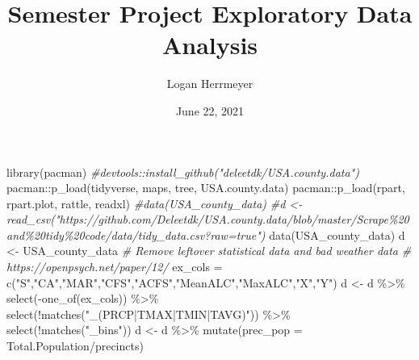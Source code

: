 \documentclass[
]{article}
\title{Semester Project Exploratory Data Analysis}
\author{Logan Herrmeyer}
\date{June 22, 2021}
\newenvironment{Shaded}{\begin{snugshade}}{\end{snugshade}}
\newcommand{\AttributeTok}[1]{\textcolor[rgb]{0.77,0.63,0.00}{#1}}
\newcommand{\CommentTok}[1]{\textcolor[rgb]{0.56,0.35,0.01}{\textit{#1}}}
\newcommand{\FunctionTok}[1]{\textcolor[rgb]{0.00,0.00,0.00}{#1}}
\newcommand{\NormalTok}[1]{#1}
\newcommand{\OtherTok}[1]{\textcolor[rgb]{0.56,0.35,0.01}{#1}}
\newcommand{\SpecialCharTok}[1]{\textcolor[rgb]{0.00,0.00,0.00}{#1}}
\newcommand{\StringTok}[1]{\textcolor[rgb]{0.31,0.60,0.02}{#1}}
\begin{document}
\maketitle

{
\setcounter{tocdepth}{2}
\tableofcontents
}
\begin{Shaded}
\begin{Highlighting}[]
\FunctionTok{library}\NormalTok{(pacman)}
\CommentTok{\#devtools::install\_github("deleetdk/USA.county.data")}
\NormalTok{pacman}\SpecialCharTok{::}\FunctionTok{p\_load}\NormalTok{(tidyverse, maps, tree, USA.county.data)}
\NormalTok{pacman}\SpecialCharTok{::}\FunctionTok{p\_load}\NormalTok{(rpart, rpart.plot, rattle, readxl)}
\CommentTok{\#data(USA\_county\_data)}
\CommentTok{\#d \textless{}{-} read\_csv("https://github.com/Deleetdk/USA.county.data/blob/master/Scrape\%20and\%20tidy\%20code/data/tidy\_data.csv?raw=true")}
\FunctionTok{data}\NormalTok{(USA\_county\_data)}
\NormalTok{d }\OtherTok{\textless{}{-}}\NormalTok{ USA\_county\_data}
\CommentTok{\# Remove leftover statistical data and bad weather data}
\CommentTok{\# https://openpsych.net/paper/12/}
\NormalTok{ex\_cols }\OtherTok{=} \FunctionTok{c}\NormalTok{(}\StringTok{"S"}\NormalTok{,}\StringTok{"CA"}\NormalTok{,}\StringTok{"MAR"}\NormalTok{,}\StringTok{"CFS"}\NormalTok{,}\StringTok{"ACFS"}\NormalTok{,}\StringTok{"MeanALC"}\NormalTok{,}\StringTok{"MaxALC"}\NormalTok{,}\StringTok{"X"}\NormalTok{,}\StringTok{"Y"}\NormalTok{)}
\NormalTok{d }\OtherTok{\textless{}{-}}\NormalTok{ d }\SpecialCharTok{\%\textgreater{}\%}
  \FunctionTok{select}\NormalTok{(}\SpecialCharTok{{-}}\FunctionTok{one\_of}\NormalTok{(ex\_cols)) }\SpecialCharTok{\%\textgreater{}\%}
  \FunctionTok{select}\NormalTok{(}\SpecialCharTok{!}\FunctionTok{matches}\NormalTok{(}\StringTok{"\_(PRCP|TMAX|TMIN|TAVG)"}\NormalTok{)) }\SpecialCharTok{\%\textgreater{}\%}
  \FunctionTok{select}\NormalTok{(}\SpecialCharTok{!}\FunctionTok{matches}\NormalTok{(}\StringTok{"\_bins"}\NormalTok{))}
\NormalTok{d }\OtherTok{\textless{}{-}}\NormalTok{ d }\SpecialCharTok{\%\textgreater{}\%}
  \FunctionTok{mutate}\NormalTok{(}\AttributeTok{prec\_pop =}\NormalTok{ Total.Population}\SpecialCharTok{/}\NormalTok{precincts)}


\end{Highlighting}
\end{Shaded}
\end{document}
